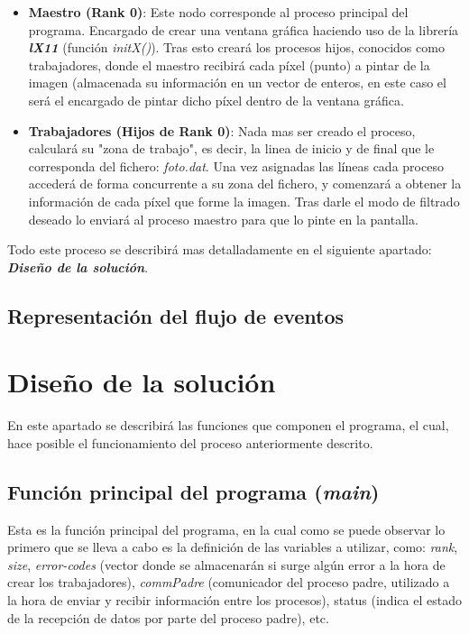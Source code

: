 \documentclass[11pt]{article}
\begin{document}
\begin{itemize}
	\item \textbf{Maestro (Rank 0)}: Este nodo corresponde al proceso principal del programa. Encargado de crear una ventana gráfica haciendo uso de la librería \textit{\textbf{lX11}} (función \textit{initX()}).
	Tras esto creará los procesos hijos, conocidos como trabajadores, donde el maestro recibirá cada píxel (punto) a pintar de la imagen (almacenada su información en un vector de enteros, en este caso el será el encargado de pintar dicho píxel dentro de la ventana gráfica.
	
	\item \textbf{Trabajadores (Hijos de Rank 0)}: Nada mas ser creado el proceso, calculará su "zona de trabajo", es decir, la linea de inicio y de final que le corresponda del fichero: \textit{foto.dat}.
	Una vez asignadas las líneas cada proceso accederá de forma concurrente a su zona del fichero, y comenzará a obtener la información de cada píxel que forme la imagen. Tras darle el modo de filtrado deseado lo enviará al proceso maestro para que lo pinte en la pantalla.
\end{itemize}

Todo este proceso se describirá mas detalladamente en el siguiente apartado: \textbf{\textit{Diseño de la solución}}.

\subsection{Representación del flujo de eventos}



\newpage
\section{Diseño de la solución}
En este apartado se describirá las funciones que componen el programa, el cual, hace posible el funcionamiento del proceso anteriormente descrito.

\subsection{Función principal del programa (\textit{main})}
Esta es la función principal del programa, en la cual como se puede observar lo primero que se lleva a cabo es la definición de las variables a utilizar, como: \textit{rank}, \textit{size}, \textit{error-codes} (vector donde se almacenarán si surge algún error a la hora de crear los trabajadores), \textit{commPadre} (comunicador del proceso padre, utilizado a la hora de enviar y recibir información entre los procesos), status (indica el estado de la recepción de datos por parte del proceso padre), etc.
\end{document}
